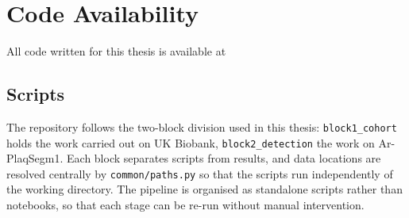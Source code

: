 \chapter*{Code Availability}

All code written for this thesis is available at

\section*{Scripts}

The repository follows the two-block division used in this thesis: \texttt{block1\_cohort}
holds the work carried out on UK Biobank, \texttt{block2\_detection} the work on Ar-PlaqSegm1.
Each block separates scripts from results, and data locations are resolved centrally by
\texttt{common/paths.py} so that the scripts run independently of the working directory. The
pipeline is organised as standalone scripts rather than notebooks, so that each stage can be
re-run without manual intervention.

